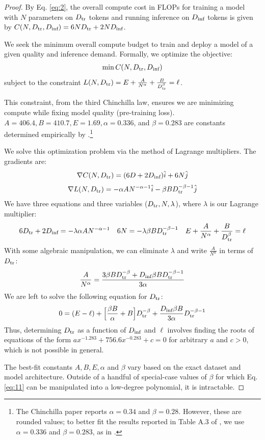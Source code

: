 \begin{proof}
By Eq. \ref{eq:2}, the overall compute cost in FLOPs for training a model with $N$ parameters on $D_{\text{tr}}$ tokens and running inference on $D_{\text{inf}}$ tokens is given by $C(N, D_{\text{tr}}, D_{\text{inf}}) = 6ND_{\text{tr}} + 2ND_{\text{inf}}$. 

We seek the minimum overall compute budget to train and deploy a model of a given quality and inference demand. Formally, we optimize the objective:
\begin{align}
\min C(N, D_{\text{tr}}, D_{\text{inf}})
\end{align}
subject to the constraint
$L(N, D_{\text{tr}}) =  E + \frac{A}{N^\alpha} + \frac{B}{D_{\text{tr}}^\beta} = \ell$.

This constraint, from the third Chinchilla law, ensures we are minimizing compute while fixing model quality (pre-training loss). $A = 406.4, B = 410.7, E = 1.69, \alpha = 0.336$, and $\beta = 0.283$ are constants determined empirically by \citet{chinchilla}.\footnote{The Chinchilla paper reports $\alpha = 0.34$ and $\beta = 0.28$. However, these are rounded values; to better fit the results reported in Table A.3 of \citet{chinchilla}, we use $\alpha = 0.336$ and $\beta = 0.283$, as in \citet{blogpost}.}

We solve this optimization problem via the method of Lagrange multipliers. The gradients are:
\begin{align}
\nabla C(N, D_{\text{tr}}) = (6D + 2D_{\text{inf}}) \hat{i} + 6N \hat{j}
\end{align}
\begin{align}
\nabla L(N, D_{\text{tr}}) = -\alpha A N^{-\alpha - 1}\hat{i} - \beta B D_{\text{tr}} ^{-\beta - 1} \hat{j}
\end{align}
We have three equations and three variables ($D_{\text{tr}}, N, \lambda$), where $\lambda$ is our Lagrange multiplier:
\begin{align}
6D_{\text{tr}} + 2D_{\text{inf}}  = -\lambda \alpha A N^{-\alpha - 1} &&
6N = -\lambda \beta B D_{\text{tr}} ^{-\beta - 1}
&&
E + \frac{A}{N^\alpha} + \frac{B}{D_{\text{tr}}^{\beta}} = \ell
\end{align}
With some algebraic manipulation, we can eliminate $\lambda$ and write $\frac{A}{N^\alpha}$ in terms of $D_{\text{tr}}$:
\begin{align}
\frac{A}{N^{\alpha}} = \frac{3\beta B D_{\text{tr}}^{-\beta} + D_{\text{inf}} \beta B D_{\text{tr}}^{-\beta-1}}{3\alpha}    
\end{align}
We are left to solve the following equation for $D_{\text{tr}}$: 
\begin{align}\label{eq:11}
0 = (E - \ell) + \Big[\frac{\beta B}{\alpha} + B\Big] D_{\text{tr}}^{-\beta} + \frac{D_{\text{inf}} \beta B}{3\alpha}D_{\text{tr}}^{-\beta-1}
\end{align}
Thus, determining $D_{\text{tr}}$ as a function of $D_{\text{inf}}$ and $\ell$ involves finding the roots of equations of the form $ ax^{-1.283} + 756.6x^{-0.283} + c = 0$ for arbitrary $a$ and $c > 0$, which is not possible in general.

The best-fit constants $A, B, E, \alpha$ and $\beta$ vary based on the exact dataset and model architecture. Outside of a handful of special-case values of $\beta$ for which Eq. \ref{eq:11} can be manipulated into a low-degree polynomial, it is intractable.  
\end{proof}

